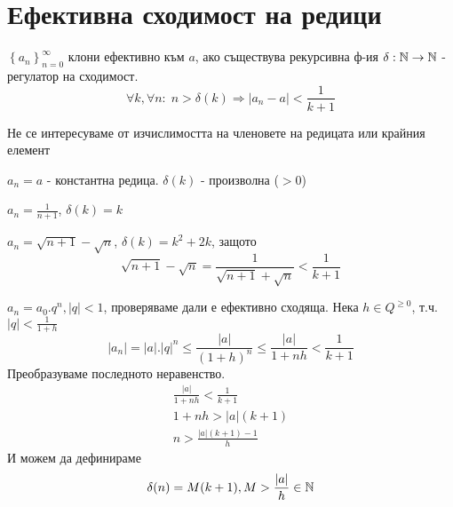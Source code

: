 \section{Ефективна сходимост на редици}
\begin{definition}
    $\left\{a_n\right\}_{n=0}^\infty$ клони ефективно към $a$, ако съществува рекурсивна ф-ия $\delta : {\mathbb{N}} \to {\mathbb{N}}$ - регулатор на сходимост.
    \begin{equation*}
        \forall k, \forall n:\; n > \delta(k) \Rightarrow |a_n - a| < \frac{1}{k+1}
    \end{equation*}
\end{definition}
\begin{remark}
    Не се интересуваме от изчислимостта на членовете на редицата или крайния елемент
\end{remark}
\begin{example}
    $a_n = a$ - константна редица. $\delta(k)$ - произволна ($> 0$)
\end{example}
\begin{example}
    $a_n = \frac{1}{n+1}$, $\delta(k) = k$
\end{example}
\begin{example}
    $a_n = \sqrt{n+1} - \sqrt{n}$, $\delta(k) = k^2 + 2k$, защото
    \begin{equation*}
        \sqrt{n+1} - \sqrt{n} = \frac{1}{\sqrt{n+1} + \sqrt{n}} < \frac{1}{k+1}
    \end{equation*}
\end{example}
\begin{example}
    $a_n = a_0.q^n, |q| < 1$, проверяваме дали е ефективно сходяща. Нека $h \in Q^{\geq 0}$, т.ч. $|q| < \frac{1}{1+h}$
    \begin{equation*}
        |a_n| = |a|.|q|^n \leq \frac{|a|}{(1+h)^n} \leq \frac{|a|}{1+nh} < \frac{1}{k+1}
    \end{equation*}
    Преобразуваме последното неравенство.
    \begin{equation*}
        \begin{split}
            \frac{|a|}{1+nh} < \frac{1}{k+1}\\
            1+nh > |a|(k+1)\\
            n > \frac{|a|(k+1) - 1}{h}
        \end{split}
    \end{equation*}
    И можем да дефинираме
    \begin{equation*}
        \delta(n) = M(k+1), M > \frac{|a|}{h} \in {\mathbb{N}}
    \end{equation*}
\end{example}
